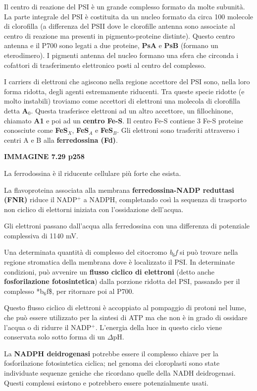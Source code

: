 \documentclass[]{article}
\begin{document}
Il centro di reazione del PSI è un grande complesso formato da molte
subunità. La parte integrale del PSI è costituita da un nucleo formato
da circa 100 molecole di clorofilla (a differenza del PSII dove le
clorofille antenna sono associate al centro di reazione ma presenti in
pigmento-proteine distinte). Questo centro antenna e il P700 sono legati
a due proteine, \textbf{PsA} e \textbf{PsB} (formano un eterodimero). I
pigmenti antenna del nucleo formano una sfera che circonda i cofattori
di trasferimento elettronico posti al centro del complesso.

I carriers di elettroni che agiscono nella regione accettore del PSI
sono, nella loro forma ridotta, degli agenti estremamente riducenti. Tra
queste specie ridotte (e molto instabili) troviamo come accettori di
elettroni una molecola di clorofilla detta \textbf{A$_0$}. Questa
trasferisce elettroni ad un altro accettore, un fillochinone, chiamato
\textbf{A1} e poi ad un \textbf{centro Fe-S}. Il centro Fe-S contiene 3
Fe-S proteine conosciute come \textbf{FeS$_X$}, \textbf{FeS$_A$} e
\textbf{FeS$_B$}. Gli elettroni sono trasferiti attraverso i centri A e
B alla \textbf{ferredossina (Fd)}.

\textbf{IMMAGINE 7.29 p258}

La ferrodossina è il riducente cellulare più forte che esista.

La flavoproteina associata alla membrana \textbf{ferredossina-NADP
reduttasi (FNR)} riduce il NADP$^+$ a NADPH, completando così la
sequenza di trasporto non ciclico di elettorni iniziata con
l'ossidazione dell'acqua.

Gli elettroni passano dall'acqua alla ferredossina con una differenza di
potenziale complessiva di 1140 mV.

Una determinata quantità di complesso del citocromo \emph{b$_6$f} si può
trovare nella regione stromatica della membrana dove è localizzato il
PSI. In determinate condizioni, può avvenire un \textbf{flusso ciclico
di elettroni} (detto anche \textbf{fosforilazione fotosintetica}) dalla
porzione ridotta del PSI, passando per il complesso *b$_6$f\$, per
ritornare poi al P700.

Questo flusso ciclico di elettroni è accoppiato al pompaggio di protoni
nel lume, che può essere utilizzato per la sintesi di ATP ma che non è
in grado di ossidare l'acqua o di ridurre il NADP$^+$. L'energia della
luce in questo ciclo viene conservata solo sotto forma di un $\Delta$pH.

La \textbf{NADPH deidrogenasi} potrebbe essere il complesso chiave per
la fosforilazione fotosintetica ciclica; nel genoma dei cloroplasti sono
state individuate sequenze geniche che ricordano quelle della NADH
deidrogenasi. Questi complessi esistono e potrebbero essere
potenzialmente usati.
\end{document}

